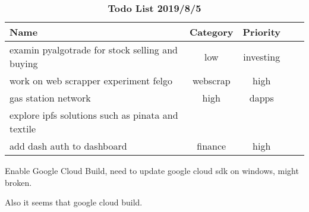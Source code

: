 \begin{table}
\begin{tabular}{p{3cm} c c c c}Name & Category & Priority \\ \hline  examin pyalgotrade for stock selling and buying &  low &  investing \\ \hline  work on web scrapper experiment felgo &  webscrap &  high \\ \hline  gas station network  &  high &  dapps \\ \hline  explore ipfs solutions such as pinata and textile &   &  \\ \hline  add dash auth to dashboard &  finance &  high \\ \hline
\end{tabular}
\caption{\textbf{Todo List 2019/8/5}}
\end{table}

Enable Google Cloud Build, need to update google cloud sdk on windows, might broken.

Also it seems that google cloud build.

